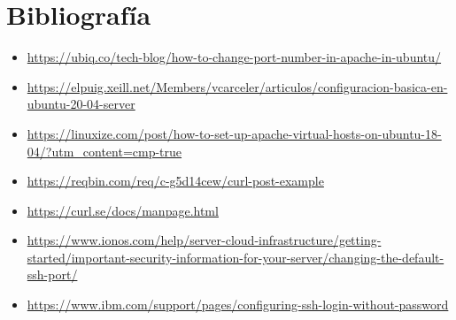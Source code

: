 \documentclass[twoside]{article}
\begin{document}
\newpage
\section*{Bibliografía}
\begin{itemize}
    \item \url{https://ubiq.co/tech-blog/how-to-change-port-number-in-apache-in-ubuntu/}
    \item \url{https://elpuig.xeill.net/Members/vcarceler/articulos/configuracion-basica-en-ubuntu-20-04-server}
    \item \url{https://linuxize.com/post/how-to-set-up-apache-virtual-hosts-on-ubuntu-18-04/?utm_content=cmp-true}
    \item \url{https://reqbin.com/req/c-g5d14cew/curl-post-example}
    \item \url{https://curl.se/docs/manpage.html}
    \item \url{https://www.ionos.com/help/server-cloud-infrastructure/getting-started/important-security-information-for-your-server/changing-the-default-ssh-port/}
    \item \url{https://www.ibm.com/support/pages/configuring-ssh-login-without-password}
\end{itemize}
\end{document}
